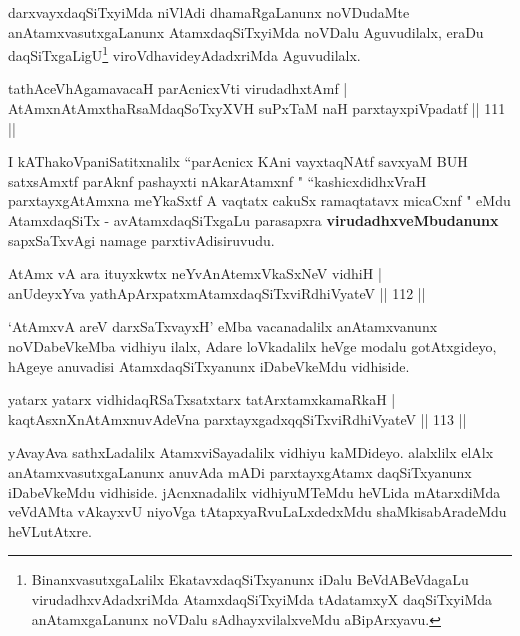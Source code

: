 \begin{artha}
darxvayxdaqSiTxyiMda niVlAdi dhamaRgaLanunx noVDudaMte anAtamxvasutxgaLanunx AtamxdaqSiTxyiMda noVDalu Aguvudilalx, eraDu daqSiTxgaLigU\footnote{BinanxvasutxgaLalilx EkatavxdaqSiTxyanunx iDalu BeVdABeVdagaLu virudadhxvAdadxriMda AtamxdaqSiTxyiMda tAdatamxyX daqSiTxyiMda anAtamxgaLanunx noVDalu sAdhayxvilalxveMdu aBipArxyavu.} viroVdhavideyAdadxriMda Aguvudilalx.
\end{artha}


\begin{shl}
tathAceVhA\s \s gamavacaH parAcnicxVti virudadhxtAmf |\\
AtAmxnAtAmxthaRsaMdaqSoTxyXVH suPxTaM naH parxtayxpiVpadatf \hfill || 111 ||
\end{shl}

\begin{artha}
I kAThakoVpaniSatitxnalilx ``parAcnicx KAni vayxtaqNAtf savxyaM BUH satxsAmxtf parAknf pashayxti nAkarAtamxnf " ``kashicxdidhxVraH parxtayxgAtAmxna meYkaSxtf A vaqtatx cakuSx ramaqtatavx micaCxnf " eMdu AtamxdaqSiTx - avAtamxdaqSiTxgaLu parasapxra \textbf{virudadhxveMbudanunx} sapxSaTxvAgi namage parxtivAdisiruvudu.
\end{artha}


\begin{shl}
AtAmx vA ara ituyxkwtx neYvAnAtemxVkaSxNeV vidhiH |\\
anUdeyxYva yathApArxpatxmAtamxdaqSiTxviRdhiVyateV \hfill || 112 ||
\end{shl}

`AtAmxvA areV darxSaTxvayxH' eMba vacanadalilx anAtamxvanunx noVDabeVkeMba vidhiyu ilalx, Adare loVkadalilx heVge modalu gotAtxgideyo, hAgeye anuvadisi AtamxdaqSiTxyanunx iDabeVkeMdu vidhiside.


\begin{shl}
yatarx yatarx vidhidaqRSaTxsatxtarx tatArx\s \s tamxkamaRkaH |\\
kaqtAsxnXnAtAmxnuvAdeVna parxtayxgadxqqSiTxviRdhiVyateV \hfill || 113 ||
\end{shl}

\begin{artha}
yAvayAva sathxLadalilx AtamxviSayadalilx vidhiyu kaMDideyo. alalxlilx elAlx anAtamxvasutxgaLanunx anuvAda mADi parxtayxgAtamx daqSiTxyanunx iDabeVkeMdu vidhiside. jAcnxnadalilx vidhiyuMTeMdu heVLida mAtarxdiMda veVdAMta vAkayxvU niyoVga tAtapxyaRvuLaLxdedxMdu shaMkisabAradeMdu heVLutAtxre. 
\end{artha}

